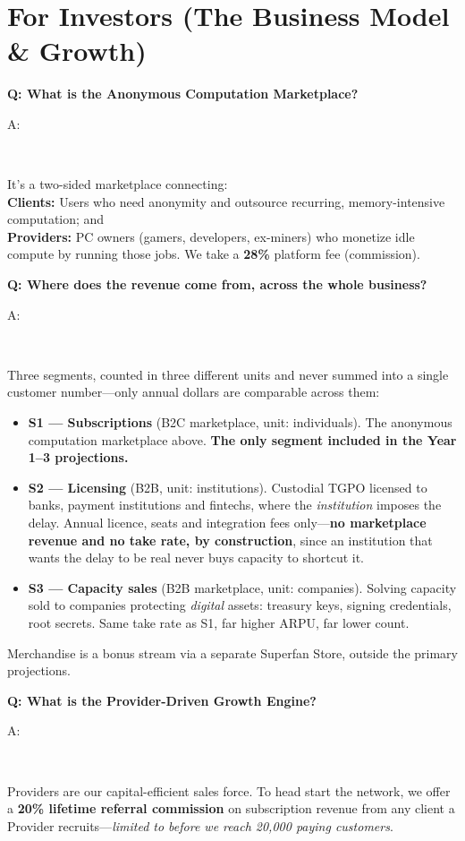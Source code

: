 \documentclass[12pt,a4paper]{article}
\newenvironment{question}[1]{%
  \vspace{0.8em}\noindent\textbf{Q: #1}\par
  \vspace{0.2em}\noindent\begin{itshape}A:\end{itshape}~%
}{\vspace{0.8em}}
\begin{document}
\section{For Investors (The Business Model \& Growth)}

\begin{question}{What is the Anonymous Computation Marketplace?}
It's a two-sided marketplace connecting:\\
\textbf{Clients:} Users who need anonymity and outsource recurring, memory-intensive computation; and\\
\textbf{Providers:} PC owners (gamers, developers, ex-miners) who monetize idle compute by running those jobs. We take a \textbf{28\%} platform fee (commission).
\end{question}

\begin{question}{Where does the revenue come from, across the whole business?}
Three segments, counted in three different units and never summed into a single customer number---only annual dollars are comparable across them:
\begin{itemize}
  \item \textbf{S1 --- Subscriptions} (B2C marketplace, unit: individuals). The anonymous computation marketplace above. \textbf{The only segment included in the Year 1--3 projections.}
  \item \textbf{S2 --- Licensing} (B2B, unit: institutions). Custodial TGPO licensed to banks, payment institutions and fintechs, where the \emph{institution} imposes the delay. Annual licence, seats and integration fees only---\textbf{no marketplace revenue and no take rate, by construction}, since an institution that wants the delay to be real never buys capacity to shortcut it.
  \item \textbf{S3 --- Capacity sales} (B2B marketplace, unit: companies). Solving capacity sold to companies protecting \emph{digital} assets: treasury keys, signing credentials, root secrets. Same take rate as S1, far higher ARPU, far lower count.
\end{itemize}
Merchandise is a bonus stream via a separate Superfan Store, outside the primary projections.
\end{question}

\begin{question}{What is the Provider-Driven Growth Engine?}
Providers are our capital-efficient sales force. To head start the network, we offer a \textbf{20\% lifetime referral commission} on subscription revenue from any client a Provider recruits—\emph{limited to before we reach 20,000 paying customers}.
\end{question}
\end{document}
